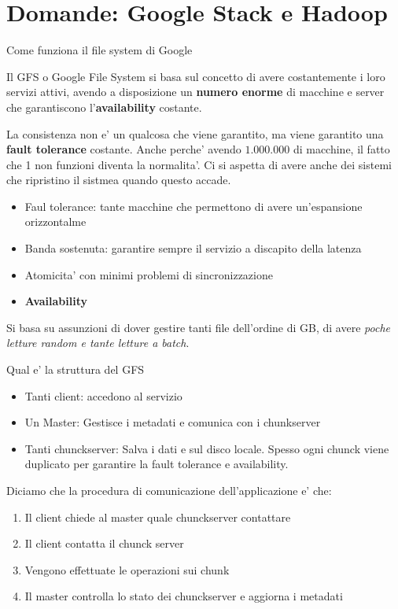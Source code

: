 \section{Domande: Google Stack e Hadoop}

\begin{domanda}
    Come funziona il file system di Google
\end{domanda}

Il GFS o Google File System si basa sul concetto di avere costantemente i loro
servizi attivi, avendo a disposizione un \textbf{numero enorme} di macchine e
server che garantiscono l'\textbf{availability} costante.

La consistenza non e' un qualcosa che viene garantito, ma viene garantito una
\textbf{fault tolerance} costante. Anche perche' avendo $1.000.000$ di
macchine, il fatto che 1 non funzioni diventa la normalita'. Ci si aspetta di
avere anche dei sistemi che ripristino il sistmea quando questo accade.

\begin{itemize}
    \item Faul tolerance: tante macchine che permettono di avere un'espansione
          orizzontalme
    \item Banda sostenuta: garantire sempre il servizio a discapito della latenza
    \item Atomicita' con minimi problemi di sincronizzazione
    \item \textbf{Availability}
\end{itemize}

Si basa su assunzioni di dover gestire tanti file dell'ordine di GB, di avere
\textit{poche letture random e tante letture a batch}.

\begin{domanda}
    Qual e' la struttura del GFS
\end{domanda}

\begin{itemize}
    \item Tanti client: accedono al servizio
    \item Un Master: Gestisce i metadati e comunica con i chunkserver
    \item Tanti chunckserver: Salva i dati e sul disco locale. Spesso ogni chunck viene
          duplicato per garantire la fault tolerance e availability.
\end{itemize}

Diciamo che la procedura di comunicazione dell'applicazione e' che:
\begin{enumerate}
    \item Il client chiede al master quale chunckserver contattare
    \item Il client contatta il chunck server
    \item Vengono effettuate le operazioni sui chunk
    \item Il master controlla lo stato dei chunckserver e aggiorna i metadati
\end{enumerate}

